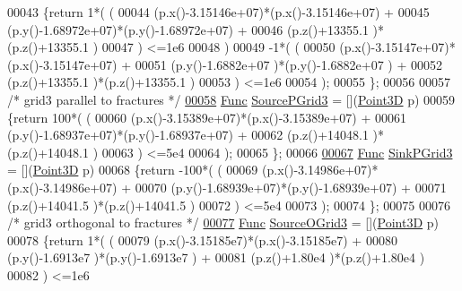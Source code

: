 \begin{DoxyCode}
00043     \{\textcolor{keywordflow}{return}  1*( (
00044                    (p.x()-3.15146e+07)*(p.x()-3.15146e+07) +
00045                    (p.y()-1.68972e+07)*(p.y()-1.68972e+07) +
00046                    (p.z()+13355.1    )*(p.z()+13355.1    )
00047                  ) <=1e6
00048                )
00049             -1*( (
00050                    (p.x()-3.15147e+07)*(p.x()-3.15147e+07) +
00051                    (p.y()-1.6882e+07 )*(p.y()-1.6882e+07 ) +
00052                    (p.z()+13355.1    )*(p.z()+13355.1    )
00053                  ) <=1e6
00054                );
00055     \};
00056 
00057 \textcolor{comment}{/* grid3 parallel to fractures */}
\hypertarget{functions_8hpp_source.tex_l00058}{}\hyperlink{namespaceFVCode3D_ae622d8dcaded68fd7f8d650f0a8d9f71}{00058} \hyperlink{namespaceFVCode3D_a38fa3b2520ad364d2c3d56ea5077826a}{Func} \hyperlink{namespaceFVCode3D_ae622d8dcaded68fd7f8d650f0a8d9f71}{SourcePGrid3} = [](\hyperlink{classFVCode3D_1_1Point3D}{Point3D} p)
00059     \{\textcolor{keywordflow}{return} 100*( (
00060                     (p.x()-3.15389e+07)*(p.x()-3.15389e+07) +
00061                     (p.y()-1.68937e+07)*(p.y()-1.68937e+07) +
00062                     (p.z()+14048.1    )*(p.z()+14048.1    )
00063                   ) <=5e4
00064                 );
00065     \};
00066 
\hypertarget{functions_8hpp_source.tex_l00067}{}\hyperlink{namespaceFVCode3D_a8e5a12e6a9e22baa4378e82fdfcc7613}{00067} \hyperlink{namespaceFVCode3D_a38fa3b2520ad364d2c3d56ea5077826a}{Func} \hyperlink{namespaceFVCode3D_a8e5a12e6a9e22baa4378e82fdfcc7613}{SinkPGrid3} = [](\hyperlink{classFVCode3D_1_1Point3D}{Point3D} p)
00068     \{\textcolor{keywordflow}{return} -100*( (
00069                      (p.x()-3.14986e+07)*(p.x()-3.14986e+07) +
00070                      (p.y()-1.68939e+07)*(p.y()-1.68939e+07) +
00071                      (p.z()+14041.5    )*(p.z()+14041.5    )
00072                    ) <=5e4
00073                  );
00074     \};
00075 
00076 \textcolor{comment}{/* grid3 orthogonal to fractures */}
\hypertarget{functions_8hpp_source.tex_l00077}{}\hyperlink{namespaceFVCode3D_ac7d83a03f6c58a7410364b917cf7ebc5}{00077} \hyperlink{namespaceFVCode3D_a38fa3b2520ad364d2c3d56ea5077826a}{Func} \hyperlink{namespaceFVCode3D_ac7d83a03f6c58a7410364b917cf7ebc5}{SourceOGrid3} = [](\hyperlink{classFVCode3D_1_1Point3D}{Point3D} p)
00078     \{\textcolor{keywordflow}{return} 1*( (
00079                     (p.x()-3.15185e7)*(p.x()-3.15185e7) +
00080                     (p.y()-1.6913e7 )*(p.y()-1.6913e7 ) +
00081                     (p.z()+1.80e4   )*(p.z()+1.80e4   )
00082                  ) <=1e6

\end{DoxyCode}
